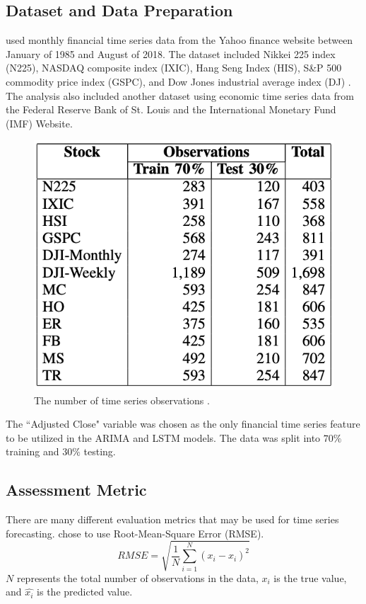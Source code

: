 \documentclass[twoside,11pt]{article}
\begin{document}
\subsection{Dataset and Data Preparation}
\cite{siami-namini:2018} used monthly financial time series data from the Yahoo finance website between January of 1985 and August of 2018. The dataset included Nikkei 225 index (N225), NASDAQ composite index (IXIC), Hang Seng Index (HIS), S\&P 500 commodity price index (GSPC), and Dow Jones industrial average index (DJ) \citep{siami-namini:2018}. The analysis also included another dataset using economic time series data from the Federal Reserve Bank of St. Louis and the International Monetary Fund (IMF) Website.

\begin{figure}[H]
    \centering
    \includegraphics[scale=0.75]{img/table.png}
    \caption{The number of time series observations \citep{siami-namini:2018}.}
    \label{fig:table}
\end{figure}

The ``Adjusted Close" variable was chosen as the only financial time series feature to be utilized in the ARIMA and LSTM models. The data was split into $70\%$ training and $30\%$ testing.

\subsection{Assessment Metric}
There are many different evaluation metrics that may be used for time series forecasting. \cite{siami-namini:2018} chose to use Root-Mean-Square Error (RMSE).
\begin{equation}
    RMSE = \sqrt{\frac{1}{N}\sum_{i=1}^N (x_i-\hat{x_i})^2}
\end{equation}
$N$ represents the total number of observations in the data, $x_i$ is the true value, and $\hat{x_i}$ is the predicted value. 
\end{document}
